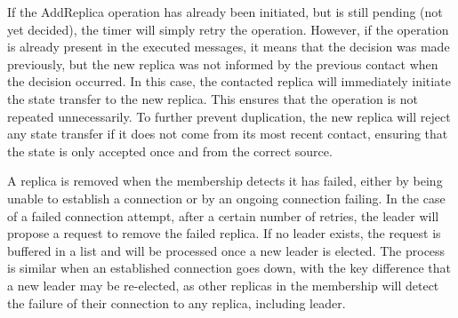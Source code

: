 \documentclass[sigconf]{acmart}
\begin{document}
If the AddReplica operation has already been initiated, but is still pending (not yet decided), the timer will simply retry the operation. However, if the operation is already present in the executed messages, it means that the decision was made previously, but the new replica was not informed by the previous contact when the decision occurred. In this case, the contacted replica will immediately initiate the state transfer to the new replica. This ensures that the operation is not repeated unnecessarily. To further prevent duplication, the new replica will reject any state transfer if it does not come from its most recent contact, ensuring that the state is only accepted once and from the correct source.

A replica is removed when the membership detects it has failed, either by being unable to establish a connection or by an ongoing connection failing. In the case of a failed connection attempt, after a certain number of retries, the leader will propose a request to remove the failed replica. If no leader exists, the request is buffered in a list and will be processed once a new leader is elected. The process is similar when an established connection goes down, with the key difference that a new leader may be re-elected, as other replicas in the membership will detect the failure of their connection to any replica, including leader.
\end{document}
